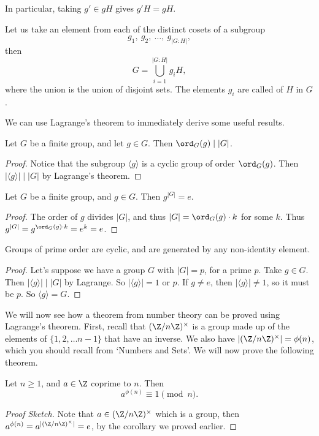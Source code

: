 \documentclass[a4paper]{scrartcl}
\begin{document}
In particular, taking $g' \in gH$ gives $g'H = gH$.

Let us take an element from each of the distinct cosets of a subgroup
$$
g_1,\ g_2, \ \dots, \ g_{|G:H|},
$$
then
$$
G = \bigcup_{i = 1}^{|G:H|} g_i H,
$$
where the union is the union of disjoint sets. The elements $g_i$ are called  of $H$ in $G$. 

We can use Lagrange's theorem to immediately derive some useful results.

\begin{corollary}
	Let $G$ be a finite group, and let $g \in G$. Then $\ord_G(g) \mid |G|$.
\end{corollary}
\begin{proof}
	Notice that the subgroup $\langle g \rangle$ is a cyclic group of order $\ord_G(g)$. Then $|\langle g \rangle|  \mid |G|$ by Lagrange's theorem.
\end{proof}

\begin{corollary}
	Let $G$ be a finite group, and $g \in G$. Then $g^{|G|} = e$.
\end{corollary}
\begin{proof}
	The order of $g$ divides $|G|$, and thus $|G| = \ord_G(g) \cdot k$ for some $k$. Thus $g^{|G|} = g^{\ord_G(g) \cdot k} = e^k = e$.
\end{proof}

\begin{corollary}\label{cor:primecyclic}
	Groups of prime order are cyclic, and are generated by any non-identity element.
\end{corollary}
\begin{proof}
Let's suppose we have a group $G$ with $|G| = p$, for a prime $p$. Take $g \in G$. Then $|\langle g \rangle| \mid |G|$ by Lagrange. So $|\langle g \rangle | = 1$ or $p$. If $g \neq e$, then $|\langle g \rangle |\neq 1$, so it must be $p$. So $\langle g \rangle = G$. 
\end{proof}

We will now see how a theorem from number theory can be proved using Lagrange's theorem. First, recall that $(\Z/n\Z)^\times$ is a group made up of the elements of $\{1, 2, \dots n - 1\}$ that have an inverse. We also have $|(\Z/n\Z)^\times| = \phi(n)$, which you should recall from `Numbers and Sets'. We will now prove the following theorem.

\begin{theorem}
	Let $n \geq 1$, and $a \in \Z$ coprime to $n$. Then
	$$
	a^{\phi(n)} \equiv 1 \pmod{n}.
	$$
\end{theorem}
\begin{proof}[Proof Sketch]
	Note that $a \in (\Z/n\Z)^\times$ which is a group, then $a^{\phi(n)} = a^{| (\Z/n\Z)^\times|} = e$, by the corollary we proved earlier.
\end{proof}
\end{document}
